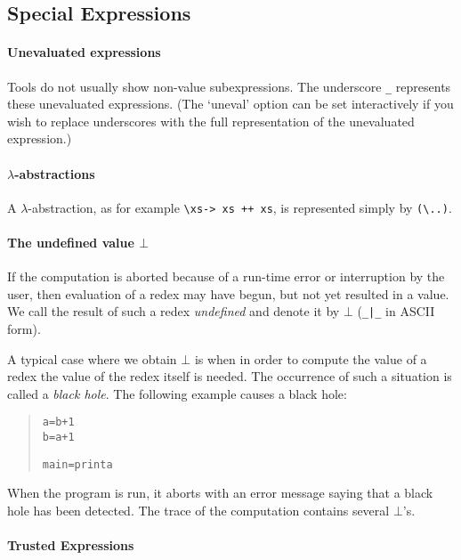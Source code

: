 \documentclass[12pt]{article}
\newenvironment{code}{\begin{quote}\begin{alltt}}{\end{alltt}\end{quote}}
\begin{document}
\subsection{Special Expressions}

\paragraph{Unevaluated expressions}

Tools do not usually show non-value subexpressions.  The underscore
\texttt{\_} represents these unevaluated expressions.  (The `uneval'
option can be set interactively if you wish to replace underscores
with the full representation of the unevaluated expression.)

\paragraph{$\lambda$-abstractions}

A $\lambda$-abstraction, as for example 
\verb?\xs-> xs ++ xs?,
is represented simply by \verb?(\..)?.

\paragraph{The undefined value $\bot$}

If the computation is aborted because of a run-time error or
interruption by the user, then evaluation of a redex may have begun,
but not yet resulted in a value.  We call the result of such a redex
\emph{undefined} and denote it by $\bot$ (\texttt{\_|\_} in ASCII
form).

A typical case where we obtain $\bot$ is when in order to compute
the value of a redex the value of the redex itself is needed. The
occurrence of such a situation is called a \emph{black hole}. The
following example causes a black hole:

\begin{code}
a = b + 1
b = a + 1

main = print a
\end{code}

When the program is run, it aborts with an error message saying
that a black hole has been detected.  The trace of the computation
contains several $\bot$'s.

\paragraph{Trusted Expressions}
\end{document}
